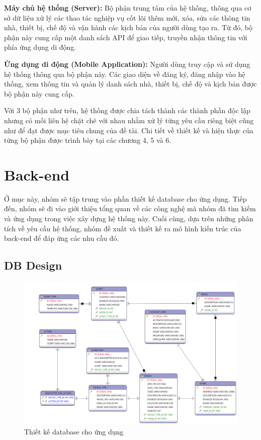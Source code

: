 \documentclass[12pt,a4paper,oneside]{extbook}
\begin{document}
\textbf{Máy chủ hệ thống (Server):} Bộ phận trung tâm của hệ thống, thông qua cơ sở dữ liệu xử lý các thao tác nghiệp vụ cốt lõi thêm mới, xóa, sửa các thông tin nhà, thiết bị, chế độ và vận hành các kịch bản của người dùng tạo ra. Từ đó, bộ phận này cung cấp một danh sách API để giao tiếp, truyền nhận thông tin với phía ứng dụng di động.

\textbf{Ứng dụng di động (Mobile Application):} Người dùng truy cập và sử dụng hệ thống thông qua bộ phận này. Các giao diện về đăng ký, đăng nhập vào hệ thống, xem thông tin và quản lý danh sách nhà, thiết bị, chế độ và kịch bản được bộ phận này cung cấp.

Với 3 bộ phận như trên, hệ thống được chia tách thành các thành phần độc lập nhưng có mối liên hệ chặt chẽ với nhau nhằm xử lý từng yêu cầu riêng biệt cũng như để đạt được mục tiêu chung của đề tài. Chi tiết về thiết kế và hiện thực của từng bộ phận được trình bày tại các chương 4, 5 và 6.

\chapter{Back-end}
Ở mục này, nhóm sẽ tập trung vào phần thiết kế database cho ứng dụng. Tiếp đến, nhóm sẽ đi vào giới thiệu tổng quan về các công nghệ mà nhóm đã tìm kiếm và ứng dụng trong việc xây dựng hệ thống này. Cuối cùng, dựa trên những phân tích về yêu cầu hệ thống, nhóm đề xuất và thiết kế ra mô hình kiến trúc của back-end để đáp ứng các nhu cầu đó.

\section{DB Design}

\begin{figure}[h]
  \centering
     \includegraphics[width=15cm]{3-smart-home-db}
  \caption{Thiết kế database cho ứng dụng}\label{fig:3-smart-home-db}
\end{figure}
\end{document}
